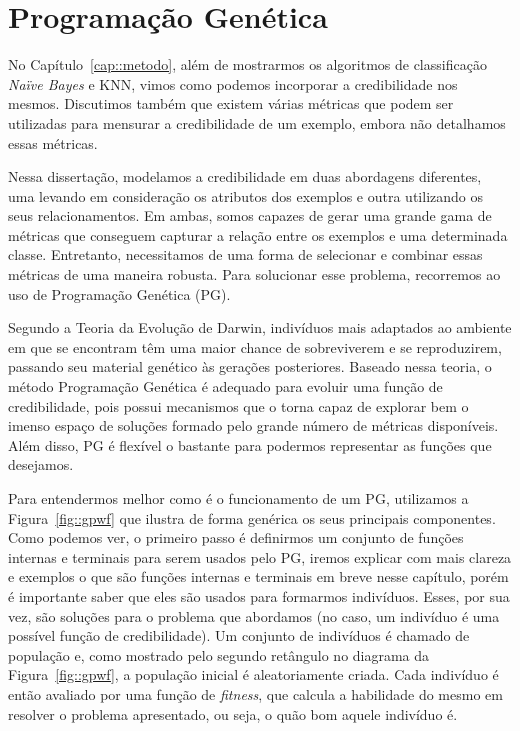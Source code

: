 \section{Programação Genética}
\label{cap::gp}

No Capítulo~\ref{cap::metodo},
além de mostrarmos os algoritmos de classificação \textit{Naïve Bayes} e \textsc{KNN}, vimos como podemos incorporar a credibilidade nos mesmos.
Discutimos também que existem várias métricas que podem ser utilizadas para mensurar a credibilidade de um exemplo, 
embora não detalhamos essas métricas.

Nessa dissertação, modelamos a credibilidade em duas abordagens diferentes, uma levando em consideração os atributos dos exemplos e outra utilizando os seus relacionamentos. 
Em ambas, somos capazes de gerar uma grande gama de métricas que conseguem capturar a relação entre os exemplos e uma determinada classe.
Entretanto, necessitamos de uma forma de selecionar e combinar essas métricas de uma maneira robusta. Para solucionar esse problema, recorremos ao uso de Programação Genética (\textsc{PG}).

Segundo a Teoria da Evolução de Darwin, indivíduos mais adaptados ao ambiente em que se encontram têm uma maior chance de sobreviverem e se reproduzirem, passando seu material genético às gerações posteriores. Baseado nessa teoria, o método Programação Genética é adequado para evoluir uma função de credibilidade, pois possui mecanismos que o torna capaz de explorar bem o imenso espaço de soluções formado pelo grande número de métricas disponíveis. Além disso, \textsc{PG} é flexível o bastante para podermos representar as funções que desejamos.

Para entendermos melhor como é o funcionamento de um \textsc{PG}, utilizamos a Figura~\ref{fig::gpwf} que ilustra de forma genérica os seus principais componentes.
Como podemos ver, o primeiro passo é definirmos um conjunto de funções internas e terminais para serem usados pelo \textsc{PG}, iremos explicar com mais clareza e exemplos o que são funções internas e terminais em breve nesse capítulo, porém é importante saber que eles são usados para formarmos indivíduos. 
Esses, por sua vez, são soluções para o problema que abordamos (no caso, um indivíduo é uma possível função de credibilidade).
Um conjunto de indivíduos é chamado de população e, como mostrado pelo segundo retângulo no diagrama da Figura~\ref{fig::gpwf}, a população inicial é aleatoriamente criada. 
Cada indivíduo é então avaliado por uma função de \textit{fitness}, que calcula a habilidade do mesmo em resolver o problema apresentado, ou seja, o quão bom aquele indivíduo é.

